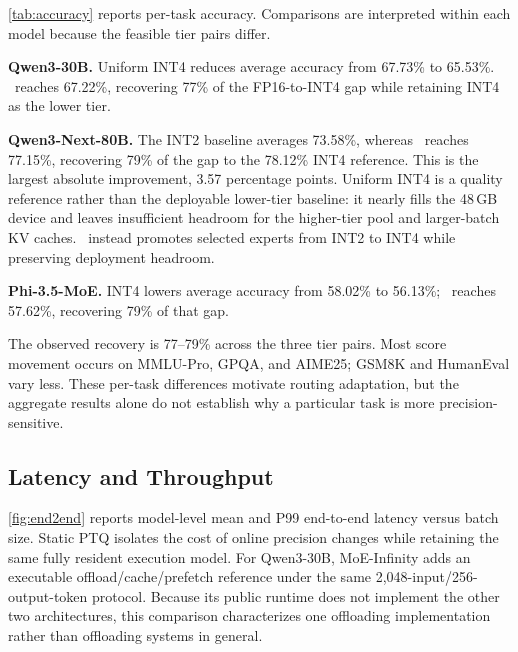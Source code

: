 \autoref{tab:accuracy} reports per-task accuracy. Comparisons are interpreted within each model because the feasible tier pairs differ.

\textbf{Qwen3-30B.} Uniform INT4 reduces average accuracy from 67.73\% to 65.53\%. \systemname\ reaches 67.22\%, recovering 77\% of the FP16-to-INT4 gap while retaining INT4 as the lower tier.

\textbf{Qwen3-Next-80B.} The INT2 baseline averages 73.58\%, whereas \systemname\ reaches 77.15\%, recovering 79\% of the gap to the 78.12\% INT4 reference. This is the largest absolute improvement, 3.57 percentage points. Uniform INT4 is a quality reference rather than the deployable lower-tier baseline: it nearly fills the 48\,GB device and leaves insufficient headroom for the higher-tier pool and larger-batch KV caches. \systemname\ instead promotes selected experts from INT2 to INT4 while preserving deployment headroom.

\textbf{Phi-3.5-MoE.} INT4 lowers average accuracy from 58.02\% to 56.13\%; \systemname\ reaches 57.62\%, recovering 79\% of that gap.

The observed recovery is 77--79\% across the three tier pairs. Most score movement occurs on MMLU-Pro, GPQA, and AIME25; GSM8K and HumanEval vary less. These per-task differences motivate routing adaptation, but the aggregate results alone do not establish why a particular task is more precision-sensitive.

\subsection{Latency and Throughput}
\label{sec:eval-performance}

\autoref{fig:end2end} reports model-level mean and P99 end-to-end latency versus batch size. Static PTQ isolates the cost of online precision changes while retaining the same fully resident execution model. For Qwen3-30B, MoE-Infinity adds an executable offload/cache/prefetch reference under the same 2,048-input/256-output-token protocol. Because its public runtime does not implement the other two architectures, this comparison characterizes one offloading implementation rather than offloading systems in general.


